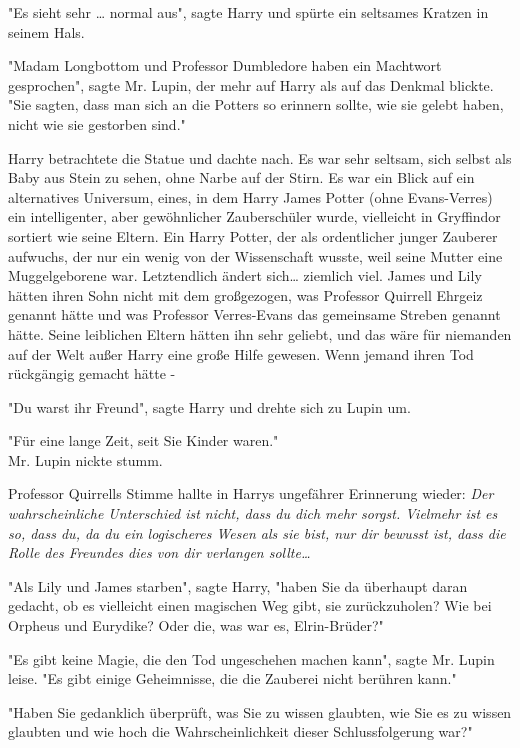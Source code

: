 {"Es sieht sehr … normal aus", sagte Harry und spürte ein seltsames Kratzen in seinem Hals.

"Madam Longbottom und Professor Dumbledore haben ein Machtwort gesprochen", sagte Mr. Lupin, der mehr auf Harry als auf das Denkmal blickte. "Sie sagten, dass man sich an die Potters so erinnern sollte, wie sie gelebt haben, nicht wie sie gestorben sind."

Harry betrachtete die Statue und dachte nach. Es war sehr seltsam, sich selbst als Baby aus Stein zu sehen, ohne Narbe auf der Stirn. Es war ein Blick auf ein alternatives Universum, eines, in dem Harry James Potter (ohne Evans-Verres) ein intelligenter, aber gewöhnlicher Zauberschüler wurde, vielleicht in Gryffindor sortiert wie seine Eltern. Ein Harry Potter, der als ordentlicher junger Zauberer aufwuchs, der nur ein wenig von der Wissenschaft wusste, weil seine Mutter eine Muggelgeborene war. Letztendlich ändert sich… ziemlich viel. James und Lily hätten ihren Sohn nicht mit dem großgezogen, was Professor Quirrell Ehrgeiz genannt hätte und was Professor Verres-Evans das gemeinsame Streben genannt hätte. Seine leiblichen Eltern hätten ihn sehr geliebt, und das wäre für niemanden auf der Welt außer Harry eine große Hilfe gewesen. Wenn jemand ihren Tod rückgängig gemacht hätte -

"Du warst ihr Freund", sagte Harry und drehte sich zu Lupin um.

"Für eine lange Zeit, seit Sie Kinder waren."\\ Mr. Lupin nickte stumm.

Professor Quirrells Stimme hallte in Harrys ungefährer Erinnerung wieder: \emph{Der wahrscheinliche Unterschied ist nicht, dass du dich mehr sorgst. Vielmehr ist es so, dass du, da du ein logischeres Wesen als sie bist, nur dir bewusst ist, dass die Rolle des Freundes dies von dir verlangen sollte…}

"Als Lily und James starben", sagte Harry, "haben Sie da überhaupt daran gedacht, ob es vielleicht einen magischen Weg gibt, sie zurückzuholen? Wie bei Orpheus und Eurydike? Oder die, was war es, Elrin-Brüder?"

"Es gibt keine Magie, die den Tod ungeschehen machen kann", sagte Mr. Lupin leise. "Es gibt einige Geheimnisse, die die Zauberei nicht berühren kann."

"Haben Sie gedanklich überprüft, was Sie zu wissen glaubten, wie Sie es zu wissen glaubten und wie hoch die Wahrscheinlichkeit dieser Schlussfolgerung war?"

}
